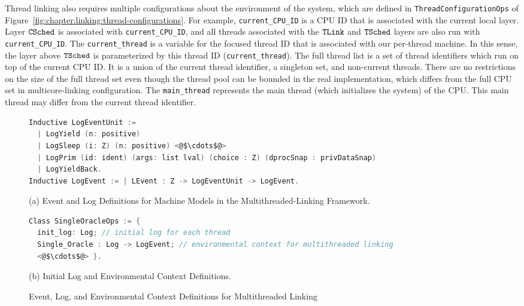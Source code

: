 Thread linking also requires multiple configurations about the environment of the system, which are defined in  
\lstinline$ThreadConfigurationOps$ of Figure~\ref{fig:chapter:linking:thread-configurations}.
For example, \lstinline$current_CPU_ID$ is a CPU ID that is 
associated with the current local layer.
Layer ${{\mathrm{\texttt{CSched}}}}$ is associated with \lstinline$current_CPU_ID$, 
and all threads associated with the ${{\mathrm{\texttt{TLink}}}}$ and ${{\mathrm{\texttt{TSched}}}}$ layers 
are also run with  \lstinline$current_CPU_ID$.
The \lstinline$current_thread$ is a variable for the focused thread ID that is associated with our per-thread machine.
In this sense, the layer above ${{\mathrm{\texttt{TSched}}}}$ is parameterized by this thread ID (\lstinline$current_thread$). 
The full thread list is a set of thread identifiers which run on top of the current CPU ID. 
It is a union of the current thread identifier, a singleton set, 
and non-current threads. 
There are no restrictions on the size of the full thread set even though 
the thread pool can be bounded in the real implementation, which differs from the full CPU set in multicore-linking configuration.
The \lstinline$main_thread$ represents the main thread (which initializes the system) of the CPU. 
This main thread may differ from the current thread identifier.

\begin{figure}
\begin{lstlisting}[language=C]
Inductive LogEventUnit :=
  | LogYield (n: positive)
  | LogSleep (i: Z) (n: positive) <@$\cdots$@>
  | LogPrim (id: ident) (args: list lval) (choice : Z) (dprocSnap : privDataSnap) 
  | LogYieldBack.
Inductive LogEvent := | LEvent : Z -> LogEventUnit -> LogEvent.
\end{lstlisting}
\begin{center}
(a) Event and Log Definitions for Machine Models in the Multithreaded-Linking Framework.
\end{center}
\begin{lstlisting}[language=C, morekeywords={Class}]
Class SingleOracleOps := {
  init_log: Log; // initial log for each thread
  Single_Oracle : Log -> LogEvent; // environmental context for multithreaded linking
  <@$\cdots$@> }.
\end{lstlisting}
\begin{center}
(b) Initial Log and Environmental Context Definitions.
\end{center}
\caption{Event, Log, and Environmental Context Definitions for Multithreaded Linking}
\label{fig:chapter:linking:event-and-log-for-multithreaded-linking}
\end{figure}



